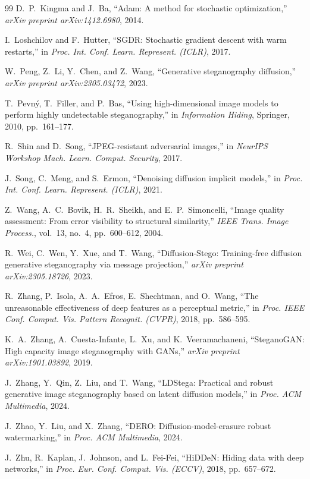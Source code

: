 \documentclass[conference]{IEEEtran}
\begin{document}
\begin{thebibliography}{99}
D.~P.~Kingma and J.~Ba, ``Adam: A method for stochastic optimization,'' \emph{arXiv preprint arXiv:1412.6980}, 2014.

I.~Loshchilov and F.~Hutter, ``{SGDR}: Stochastic gradient descent with warm restarts,'' in \emph{Proc. Int. Conf. Learn. Represent. (ICLR)}, 2017.

W.~Peng, Z.~Li, Y.~Chen, and Z.~Wang, ``Generative steganography diffusion,'' \emph{arXiv preprint arXiv:2305.03472}, 2023.

T.~Pevn{\'y}, T.~Filler, and P.~Bas, ``Using high-dimensional image models to perform highly undetectable steganography,'' in \emph{Information Hiding}, Springer, 2010, pp.~161--177.

R.~Shin and D.~Song, ``{JPEG}-resistant adversarial images,'' in \emph{NeurIPS Workshop Mach. Learn. Comput. Security}, 2017.

J.~Song, C.~Meng, and S.~Ermon, ``Denoising diffusion implicit models,'' in \emph{Proc. Int. Conf. Learn. Represent. (ICLR)}, 2021.

Z.~Wang, A.~C.~Bovik, H.~R.~Sheikh, and E.~P.~Simoncelli, ``Image quality assessment: From error visibility to structural similarity,'' \emph{IEEE Trans. Image Process.}, vol.~13, no.~4, pp.~600--612, 2004.

R.~Wei, C.~Wen, Y.~Xue, and T.~Wang, ``Diffusion-Stego: Training-free diffusion generative steganography via message projection,'' \emph{arXiv preprint arXiv:2305.18726}, 2023.

R.~Zhang, P.~Isola, A.~A.~Efros, E.~Shechtman, and O.~Wang, ``The unreasonable effectiveness of deep features as a perceptual metric,'' in \emph{Proc. IEEE Conf. Comput. Vis. Pattern Recognit. (CVPR)}, 2018, pp.~586--595.

K.~A.~Zhang, A.~Cuesta-Infante, L.~Xu, and K.~Veeramachaneni, ``{SteganoGAN}: High capacity image steganography with {GANs},'' \emph{arXiv preprint arXiv:1901.03892}, 2019.

J.~Zhang, Y.~Qin, Z.~Liu, and T.~Wang, ``{LDStega}: Practical and robust generative image steganography based on latent diffusion models,'' in \emph{Proc. ACM Multimedia}, 2024.

J.~Zhao, Y.~Liu, and X.~Zhang, ``{DERO}: Diffusion-model-erasure robust watermarking,'' in \emph{Proc. ACM Multimedia}, 2024.

J.~Zhu, R.~Kaplan, J.~Johnson, and L.~Fei-Fei, ``{HiDDeN}: Hiding data with deep networks,'' in \emph{Proc. Eur. Conf. Comput. Vis. (ECCV)}, 2018, pp.~657--672.

\end{thebibliography}
\end{document}
